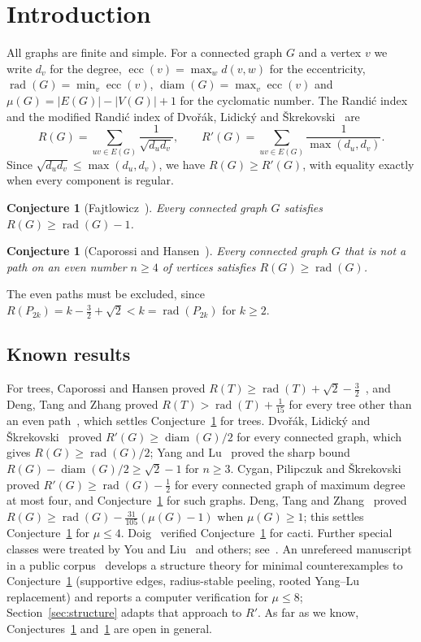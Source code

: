 \documentclass[11pt]{amsart}
\newtheorem{conjecture}[theorem]{Conjecture}
\theoremstyle{definition}
\DeclareMathOperator{\rad}{rad}
\DeclareMathOperator{\diam}{diam}
\DeclareMathOperator{\ecc}{ecc}
\newcommand{\Rp}{R'}
\begin{document}
\section{Introduction}

All graphs are finite and simple. For a connected graph $G$ and a vertex $v$ we write $d_v$ for the degree,
$\ecc(v)=\max_w d(v,w)$ for the eccentricity, $\rad(G)=\min_v\ecc(v)$, $\diam(G)=\max_v\ecc(v)$ and
$\mu(G)=|E(G)|-|V(G)|+1$ for the cyclomatic number. The Randi\'c index~\cite{Randic} and the modified
Randi\'c index of Dvo\v{r}\'ak, Lidick\'y and \v{S}krekovski~\cite{DLS} are
\[
R(G)=\sum_{uv\in E(G)}\frac1{\sqrt{d_ud_v}},\qquad \Rp(G)=\sum_{uv\in E(G)}\frac1{\max(d_u,d_v)} .
\]
Since $\sqrt{d_ud_v}\le\max(d_u,d_v)$, we have $R(G)\ge \Rp(G)$, with equality exactly when every component is regular.

\begin{conjecture}[Fajtlowicz~\cite{Fajtlowicz}]\label{conj:F}
Every connected graph $G$ satisfies $R(G)\ge\rad(G)-1$.
\end{conjecture}

\begin{conjecture}[Caporossi and Hansen~\cite{CaporossiHansen}]\label{conj:CH}
Every connected graph $G$ that is not a path on an even number $n\ge4$ of vertices satisfies $R(G)\ge\rad(G)$.
\end{conjecture}

The even paths must be excluded, since $R(P_{2k})=k-\tfrac32+\sqrt2<k=\rad(P_{2k})$ for $k\ge2$.

\subsection*{Known results}
For trees, Caporossi and Hansen proved $R(T)\ge\rad(T)+\sqrt2-\frac32$~\cite{CaporossiHansen}, and Deng, Tang and Zhang
proved $R(T)>\rad(T)+\frac1{15}$ for every tree other than an even path~\cite{DTZ}, which settles
Conjecture~\ref{conj:CH} for trees. Dvo\v{r}\'ak, Lidick\'y and \v{S}krekovski~\cite{DLS} proved $\Rp(G)\ge\diam(G)/2$ for every connected graph,
which gives $R(G)\ge\rad(G)/2$; Yang and Lu~\cite{YangLu} proved the sharp bound $R(G)-\diam(G)/2\ge\sqrt2-1$ for
$n\ge3$. Cygan, Pilipczuk and \v{S}krekovski~\cite{CPS} proved $\Rp(G)\ge\rad(G)-\tfrac12$ for every connected graph
of maximum degree at most four, and Conjecture~\ref{conj:CH} for such graphs. Deng, Tang and Zhang~\cite{DTZ}
proved $R(G)\ge\rad(G)-\tfrac{31}{105}(\mu(G)-1)$ when $\mu(G)\ge1$; this settles Conjecture~\ref{conj:F} for
$\mu\le4$. Doig~\cite{Doig1,Doig2} verified Conjecture~\ref{conj:CH} for cacti. Further special classes were treated
by You and Liu~\cite{YouLiu} and others; see~\cite{DLS}. An unrefereed manuscript in a public corpus~\cite{Corpus054}
develops a structure theory for minimal counterexamples to Conjecture~\ref{conj:CH} (supportive edges, radius-stable
peeling, rooted Yang--Lu replacement) and reports a computer verification for $\mu\le 8$; Section~\ref{sec:structure}
adapts that approach to $\Rp$. As far as we know, Conjectures~\ref{conj:F} and~\ref{conj:CH} are open in general.
\end{document}
